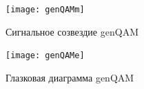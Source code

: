 \documentclass[10pt,a4paper]{article}
\begin{document}
\begin{figure}[h]\centering
	\texttt{[image: genQAMm]}
	\caption{Сигнальное созвездие genQAM}\label{fig.genQAMm}
\end{figure}                                                                                                                                                                                                                                                                                                                                                                                                                                                                                                                                                                                                                                                                                                                                                                                                                                                                                                                                                                                                                                                                                                                                                                                                                                                                                                                                                                                                                                                                        
\begin{figure}[h]\centering
	\texttt{[image: genQAMe]}
	\caption{Глазковая диаграмма genQAM}\label{fig.genQAMe}
\end{figure}                                                                                                                                                                                                                                                                                                                                                                                                                                                                                                                                                                                                                                                                                                                                                                                                                                                                                                                                                                                                                                                                                                                                                                                                                                                                                                                                                                                                                                                                        
\end{document}
